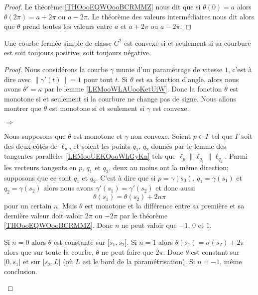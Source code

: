 \begin{proof}
    Le théorème \ref{THOooEQWOooBCRMMZ} nous dit que si \( \theta(0)=a\) alors \( \theta(2\pi)=a+2\pi\) ou \( a-2\pi\). Le théorème des valeurs intermédiaires nous dit alors que \( \theta\) prend toutes les valeurs entre \( a\) et \( a+2\pi\) ou \( a-2\pi\).
\end{proof}

\begin{proposition}      \label{PROPooWXUKooPOtPdj}
    Une courbe fermée simple de classe \(  C^{2}\) est convexe si et seulement si sa courbure est soit toujours positive, soit toujours négative.
\end{proposition}

\begin{proof}
    Nous considérons la courbe \( \gamma\) munie d'un paramétrage de vitesse \( 1\), c'est à dire avec \( \| \gamma'(t) \|=1\) pour tout \( t\). Si \( \theta\) est sa fonction d'angle, alors nous avons \( \theta'=\kappa\) par le lemme \ref{LEMooWLAUooKetUiW}. Donc la fonction \( \theta\) est monotone si et seulement si la courbure ne change pas de signe. Nous allons montrer que \( \theta\) est monotone si et seulement si \( \gamma\) est convexe.

    \begin{subproof}
        \item[\( \Rightarrow\)]

        Nous supposons que \( \theta\) est monotone et \( \gamma\) non convexe. Soient \( p\in \Gamma\) tel que \( \Gamma\) soit des deux côtés de \( \ell_p\), et soient les points \( q_1\), \( q_2\) donnés par le lemme des tangentes parallèles \ref{LEMooUEKQooWhGyKn} tels que \( \ell_p\parallel\ell_{q_1}\parallel\ell_{q_2}\). Parmi les vecteurs tangents en \( p\), \( q_1\) et \( q_2\), deux au moins ont la même direction; supposons que ce sont \( q_1\) et \( q_2\). C'est à dire que si \( p=\gamma(s_0)\), \( q_1=\gamma(s_1)\) et \( q_2=\gamma(s_2)\) alors nous avons \( \gamma'(s_1)=\gamma'(s_2)\) et donc aussi
        \begin{equation}
            \theta(s_1)=\theta(s_2)+2n\pi
        \end{equation}
        pour un certain \( n\). Mais \( \theta\) est monotone et la différence entre sa première et sa dernière valeur doit valoir \( 2\pi\) ou \( -2\pi\) par le théorème \ref{THOooEQWOooBCRMMZ}. Donc \( n\) ne peut valoir que \( -1\), \( 0\) et \( 1\).

        Si \( n=0\) alors \( \theta\) est constante sur \( \mathopen[ s_1 , s_2 \mathclose]\). Si \( n=1\) alors \( \theta(s_1)=\sigma(s_2)+2\pi\) alors que sur toute la courbe, \( \theta\) ne peut faire que \( 2\pi\). Donc \( \theta\) est constant sur \( \mathopen[ 0 , s_1 \mathclose]\) et sur \( \mathopen[ s_2 , L \mathclose]\) (où \( L\) est le bord de la paramétrisation). Si \( n=-1\), même conclusion.


\end{subproof}
\end{proof}
